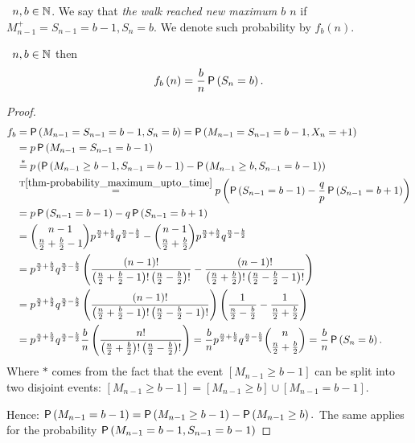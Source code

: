 \begin{defn}\label{defn-new_maximum}
 \Lrw\ $n,b\in \mathbb{N}$. We say that \emph{the walk reached new maximum $b$ \intime $n$} if $M_{n-1}^+=S_{n-1}=b-1, S_n=b$. We denote such probability by $f_b \left( n \right).$
\end{defn}
\begin{thm}\label{thm-probability_new_maximum}
 \Lrw\ $n,b \in \mathbb{N}$ then
 \[
  f_b \left( n \right) =\frac{b}{n}\operatorname{\mathsf{P}} \left( S_n=b \right).
 \]
\end{thm}
\begin{proof}
  \[
  \begin{split}
    f_b & = \operatorname{\mathsf{P}} \left( M_{n-1}=S_{n-1}=b-1, S_n=b \right)
    =\operatorname{\mathsf{P}} \left(M_{n-1}=S_{n-1}=b-1, X_n=+1\right)\\
    & =p\operatorname{\mathsf{P}} \left( M_{n-1}=S_{n-1}=b-1 \right)\\
    & \overset{*}{=}p \left( \operatorname{\mathsf{P}} \left( M_{n-1}\geq b-1, S_{n-1}=b-1 \right) -\operatorname{\mathsf{P}} \left( M_{n-1}\geq b, S_{n-1}=b-1 \right) \right) \\
    & \overset{\text{T}\ref{thm-probability_maximum_upto_time}}{=}p \left( \operatorname{\mathsf{P}} \left( S_{n-1}=b-1 \right) -\frac{q}{p}\operatorname{\mathsf{P}} \left( S_{n-1}=b+1 \right) \right) \\
    & =p\operatorname{\mathsf{P}} \left( S_{n-1}=b-1 \right) -q \operatorname{\mathsf{P}} \left( S_{n-1}=b+1 \right) \\
    & =\binom{n-1}{\frac{n}{2}+\frac{b}{2}-1}p^{\frac{n}{2}+\frac{b}{2}}q^{\frac{n}{2}-\frac{b}{2}}-\binom{n-1}{\frac{n}{2}+\frac{b}{2}}
    p^{\frac{n}{2}+\frac{b}{2}}q^{\frac{n}{2}-\frac{b}{2}}\\
    & =p^{\frac{n}{2}+\frac{b}{2}}q^{\frac{n}{2}-\frac{b}{2}} \left( \frac{ \left( n-1 \right) !}{ \left( \frac{n}{2}+\frac{b}{2}-1 \right) ! \left( \frac{n}{2}-\frac{b}{2} \right) !}-\frac{ \left( n-1 \right) !}{ \left( \frac{n}{2}+\frac{b}{2} \right) ! \left( \frac{n}{2}-\frac{b}{2}-1 \right) !} \right)\\
    & =p^{\frac{n}{2}+\frac{b}{2}}q^{\frac{n}{2}-\frac{b}{2}} \left( \frac{ \left( n-1 \right) !}{ \left( \frac{n}{2}+\frac{b}{2}-1 \right) ! \left( \frac{n}{2}-\frac{b}{2}-1 \right) !} \right) \left( \frac{1}{\frac{n}{2}-\frac{b}{2}}-\frac{1}{\frac{n}{2}+\frac{b}{2}} \right) \\
    & =p^{\frac{n}{2}+\frac{b}{2}}q^{\frac{n}{2}-\frac{b}{2}}\frac{b}{n} \left( \frac{n!}{ \left( \frac{n}{2}+\frac{b}{2} \right) ! \left( \frac{n}{2}-\frac{b}{2} \right) !} \right)
    =\frac{b}{n}p^{\frac{n}{2}+\frac{b}{2}}q^{\frac{n}{2}-\frac{b}{2}}\binom{n}{\frac{n}{2}+\frac{b}{2}}
    =\frac{b}{n}\operatorname{\mathsf{P}} \left( S_n=b \right).
     \end{split}
  \]
 Where $*$ comes from the fact that the event $[M_{n-1}\geq b-1]$ can be split into two disjoint events:
 $[M_{n-1}\geq b-1]=[M_{n-1}\geq b]\cup [M_{n-1}=b-1].$

 Hence: $\operatorname{\mathsf{P}}\left(M_{n-1}=b-1\right)=\operatorname{\mathsf{P}}\left(M_{n-1}\geq b-1\right)-\operatorname{\mathsf{P}}\left(M_{n-1}\geq b\right).$ The same applies for the probability $\operatorname{\mathsf{P}}\left(M_{n-1}=b-1, S_{n-1}=b-1\right)
 $
\end{proof}
